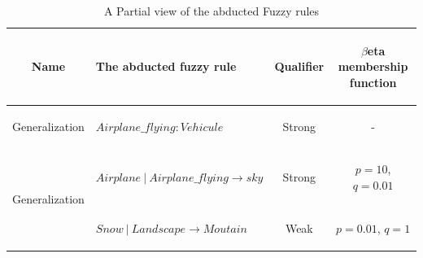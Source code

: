 	
		\begin{table}
				\centering	
				\caption{A Partial view of the abducted Fuzzy rules}
				\label{tabb2}
				\begin{tabular}{c|l|c|c} 
					\hline
					\begin{small}\begin{sffamily}Name\end{sffamily} \end{small}& 
					\begin{small}\begin{sffamily}The abducted fuzzy rule\end{sffamily}\end{small} &
					\begin{small}\begin{sffamily}Qualifier\end{sffamily}\end{small} &
					\begin{small}\begin{sffamily}$\beta$eta membership function\end{sffamily}\end{small} \\
					\hline

					\begin{small}Generalization\end{small}&
					\begin{small}$Airplane\_flying : Vehicule$\end{small}&
					\begin{small}Strong\end{small}&
					\begin{small}-\end{small}\\
							
					\hline 

					\multirow{4}{*}{\begin{small}Generalization\end{small}}&
					\begin{small}$Airplane~|~Airplane\_flying \longrightarrow  sky$\end{small}&
					\begin{small}Strong\end{small}&
					\begin{small}$p=10$, $q=0.01$\end{small}\\

					& 
					\begin{small}$Snow~|~Landscape \longrightarrow  Moutain$\end{small}&
					\begin{small}Weak\end{small}&
					\begin{small}$p=0.01$, $q=1$\end{small}\\


\end{tabular}
\end{table}
